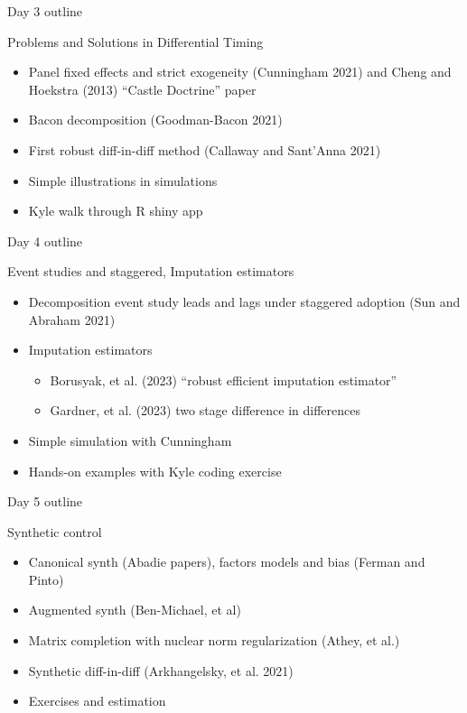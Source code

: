 \documentclass{beamer}
\begin{document}
\begin{frame}{Day 3 outline}

Problems and Solutions in Differential Timing
	\begin{itemize}
	\item Panel fixed effects and strict exogeneity (Cunningham 2021) and Cheng and Hoekstra (2013) “Castle Doctrine” paper
	\item Bacon decomposition (Goodman-Bacon 2021)
	\item First robust diff-in-diff method (Callaway and Sant’Anna 2021)
	\item Simple illustrations in simulations
	\item Kyle walk through R shiny app
	\end{itemize}

\end{frame}


\begin{frame}{Day 4 outline}

Event studies and staggered, Imputation estimators

\begin{itemize}
\item Decomposition event study leads and lags under staggered adoption (Sun and Abraham 2021)
\item Imputation estimators
		\begin{itemize}
		\item Borusyak, et al. (2023) “robust efficient imputation estimator”
		\item Gardner, et al. (2023) two stage difference in differences
		\end{itemize}
\item Simple simulation with Cunningham
\item Hands-on examples with Kyle coding exercise
\end{itemize}

\end{frame}


\begin{frame}{Day 5 outline}

Synthetic control
\begin{itemize}
\item Canonical synth (Abadie papers), factors models and bias (Ferman and Pinto)
\item Augmented synth (Ben-Michael, et al)
\item Matrix completion with nuclear norm regularization (Athey, et al.)
\item Synthetic diff-in-diff (Arkhangelsky, et al. 2021)
\item Exercises and estimation 
\end{itemize}

\end{frame}
\end{document}
